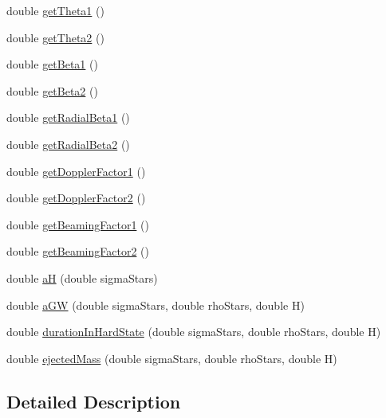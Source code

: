 \begin{DoxyCompactItemize}
double \hyperlink{class_c_a_r_m_a_1_1binary_s_m_b_h_addb75e48c8ad6c591573723cd769b547}{get\-Theta1} ()
\item 
double \hyperlink{class_c_a_r_m_a_1_1binary_s_m_b_h_a8edb8fb9e1b5a8dc38358e083c46dbdf}{get\-Theta2} ()
\item 
double \hyperlink{class_c_a_r_m_a_1_1binary_s_m_b_h_a6d011db33094577d466ac69545354224}{get\-Beta1} ()
\item 
double \hyperlink{class_c_a_r_m_a_1_1binary_s_m_b_h_a5c25dcd9bc20f4412c12bd35918c4eab}{get\-Beta2} ()
\item 
double \hyperlink{class_c_a_r_m_a_1_1binary_s_m_b_h_a4b5e37cd3bf650fd9323cbf1618fce7b}{get\-Radial\-Beta1} ()
\item 
double \hyperlink{class_c_a_r_m_a_1_1binary_s_m_b_h_a7a34ee1208184f17376ce2ce35faa80a}{get\-Radial\-Beta2} ()
\item 
double \hyperlink{class_c_a_r_m_a_1_1binary_s_m_b_h_a3bb857ed74e47c47abfe60827ad58cdf}{get\-Doppler\-Factor1} ()
\item 
double \hyperlink{class_c_a_r_m_a_1_1binary_s_m_b_h_a017176138c74d45941d4043c2dfef5d7}{get\-Doppler\-Factor2} ()
\item 
double \hyperlink{class_c_a_r_m_a_1_1binary_s_m_b_h_a5926c403ec8c60ca7720d9bdd34c6947}{get\-Beaming\-Factor1} ()
\item 
double \hyperlink{class_c_a_r_m_a_1_1binary_s_m_b_h_a20ea2af36378b3edcacb312bada6a684}{get\-Beaming\-Factor2} ()
\item 
double \hyperlink{class_c_a_r_m_a_1_1binary_s_m_b_h_a995de52ad3a5d55aca2d19c21212aaa8}{a\-H} (double sigma\-Stars)
\item 
double \hyperlink{class_c_a_r_m_a_1_1binary_s_m_b_h_ad32a6f86c4460c3da82789d7dae279c5}{a\-G\-W} (double sigma\-Stars, double rho\-Stars, double H)
\item 
double \hyperlink{class_c_a_r_m_a_1_1binary_s_m_b_h_ae3051e9ddfe8d12a84890e1ffbd3eaa4}{duration\-In\-Hard\-State} (double sigma\-Stars, double rho\-Stars, double H)
\item 
double \hyperlink{class_c_a_r_m_a_1_1binary_s_m_b_h_a48d5ce9b2c219dc6dd8321f036995829}{ejected\-Mass} (double sigma\-Stars, double rho\-Stars, double H)
\end{DoxyCompactItemize}


\subsection{Detailed Description}


